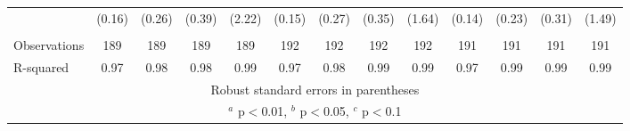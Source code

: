 \documentclass[]{article}
\begin{document}
\begin{tabular}{lcccccccccccc}
 & (0.16) & (0.26) & (0.39) & (2.22) & (0.15) & (0.27) & (0.35) & (1.64) & (0.14) & (0.23) & (0.31) & (1.49) \\
 &  &  &  &  &  &  &  &  &  &  &  &  \\
Observations & 189 & 189 & 189 & 189 & 192 & 192 & 192 & 192 & 191 & 191 & 191 & 191 \\
 R-squared & 0.97 & 0.98 & 0.98 & 0.99 & 0.97 & 0.98 & 0.99 & 0.99 & 0.97 & 0.99 & 0.99 & 0.99 \\ \hline
\multicolumn{13}{c}{ Robust standard errors in parentheses} \\
\multicolumn{13}{c}{ $^a$ p$<$0.01, $^b$ p$<$0.05, $^c$ p$<$0.1} \\
\end{tabular}
\end{document}
